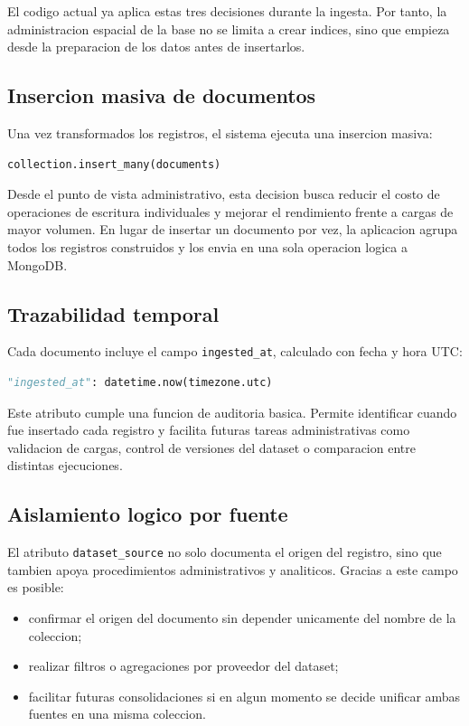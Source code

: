 \documentclass[12pt]{article}
\begin{document}
El codigo actual ya aplica estas tres decisiones durante la ingesta. Por tanto, la administracion espacial de la base no se limita a crear indices, sino que empieza desde la preparacion de los datos antes de insertarlos.

\subsection{Insercion masiva de documentos}

Una vez transformados los registros, el sistema ejecuta una insercion masiva:

\begin{lstlisting}[style=basicstyle,language=Python]
collection.insert_many(documents)
\end{lstlisting}

Desde el punto de vista administrativo, esta decision busca reducir el costo de operaciones de escritura individuales y mejorar el rendimiento frente a cargas de mayor volumen. En lugar de insertar un documento por vez, la aplicacion agrupa todos los registros construidos y los envia en una sola operacion logica a MongoDB.

\subsection{Trazabilidad temporal}

Cada documento incluye el campo \texttt{ingested\_at}, calculado con fecha y hora UTC:

\begin{lstlisting}[style=basicstyle,language=Python]
"ingested_at": datetime.now(timezone.utc)
\end{lstlisting}

Este atributo cumple una funcion de auditoria basica. Permite identificar cuando fue insertado cada registro y facilita futuras tareas administrativas como validacion de cargas, control de versiones del dataset o comparacion entre distintas ejecuciones.

\subsection{Aislamiento logico por fuente}

El atributo \texttt{dataset\_source} no solo documenta el origen del registro, sino que tambien apoya procedimientos administrativos y analiticos. Gracias a este campo es posible:

\begin{itemize}[leftmargin=*]
    \item confirmar el origen del documento sin depender unicamente del nombre de la coleccion;
    \item realizar filtros o agregaciones por proveedor del dataset;
    \item facilitar futuras consolidaciones si en algun momento se decide unificar ambas fuentes en una misma coleccion.
\end{itemize}
\end{document}
